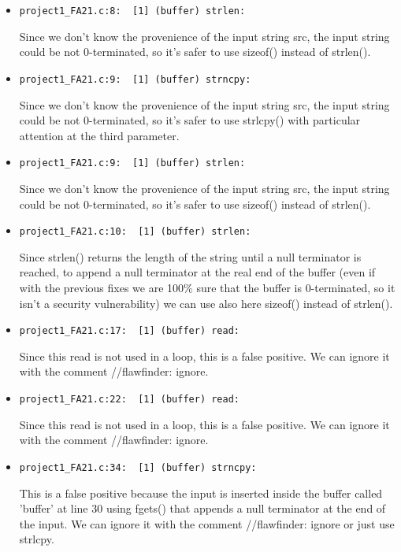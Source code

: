 \documentclass{article}
\begin{document}
\begin{itemize}
\item 
\begin{verbatim}
project1_FA21.c:8:  [1] (buffer) strlen:
\end{verbatim}
Since we don't know the provenience of the input string src, the input string could be not 0-terminated, so it's safer to use sizeof() instead of strlen(). 

\item 
\begin{verbatim}
project1_FA21.c:9:  [1] (buffer) strncpy:
\end{verbatim}
Since we don't know the provenience of the input string src, the input string could be not 0-terminated, so it's safer to use strlcpy() with particular attention at the third parameter.

\item 
\begin{verbatim}
project1_FA21.c:9:  [1] (buffer) strlen:
\end{verbatim}
Since we don't know the provenience of the input string src, the input string could be not 0-terminated, so it's safer to use sizeof() instead of strlen().

\item 
\begin{verbatim}
project1_FA21.c:10:  [1] (buffer) strlen:
\end{verbatim}
Since strlen() returns the length of the string until a null terminator is reached, to append a null terminator at the real end of the buffer (even if with the previous fixes we are 100\% sure that the buffer is 0-terminated, so it isn't a security vulnerability) we can use also here sizeof() instead of strlen().

\item 
\begin{verbatim}
project1_FA21.c:17:  [1] (buffer) read:
\end{verbatim}
Since this read is not used in a loop, this is a false positive. We can ignore it with the comment //flawfinder: ignore.

\item 
\begin{verbatim}
project1_FA21.c:22:  [1] (buffer) read:
\end{verbatim}
Since this read is not used in a loop, this is a false positive. We can ignore it with the comment //flawfinder: ignore.

\item 
\begin{verbatim}
project1_FA21.c:34:  [1] (buffer) strncpy:
\end{verbatim}
This is a false positive because the input is inserted inside the buffer called 'buffer' at line 30 using fgets() that appends a null terminator at the end of the input. We can ignore it with the comment //flawfinder: ignore or just use strlcpy.

\end{itemize}
\end{document}
